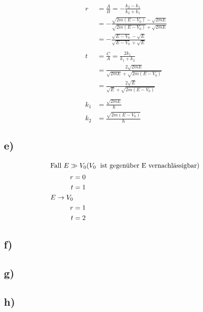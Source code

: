     \begin{align*}
        r  &= \frac{A}{B} = -\frac{k_2-k_1}{k_2+k_1}\\
        &= -\frac{\sqrt{2m(E-V_0)} - \sqrt{2mE}}{\sqrt{2m(E-V_0)} + \sqrt{2mE}}\\
        &= -\frac{\sqrt{E-V_0} - \sqrt{E}}{\sqrt{E-V_0} + \sqrt{E}}\\
        \\
        t &= \frac{C}{A} = \frac{2k_1}{k_1 + k_2}\\
        &= \frac{2\sqrt{2mE}}{\sqrt{2mE} + \sqrt{2m(E-V_0)}}\\
        &= \frac{2\sqrt{E}}{\sqrt{E} + \sqrt{2m(E-V_0)}}\\
        \\
        k_1 &= \frac{\sqrt{2mE}}{\hbar}\\
        k_2 &= \frac{\sqrt{2m(E-V_0)}}{\hbar}
    \end{align*}

\subsection{e)}

    \begin{align*}
        \intertext{Fall $E \gg V_0  (V_0\;$ ist gegen\"uber E vernachl\"assigbar)
        }
        r &= 0\\
        t &= 1\\
        E \rightarrow V_0\\
        r &= 1\\
        t &= 2
    \end{align*}

\subsection{f)}

 

\subsection{g)}



\subsection{h)}





